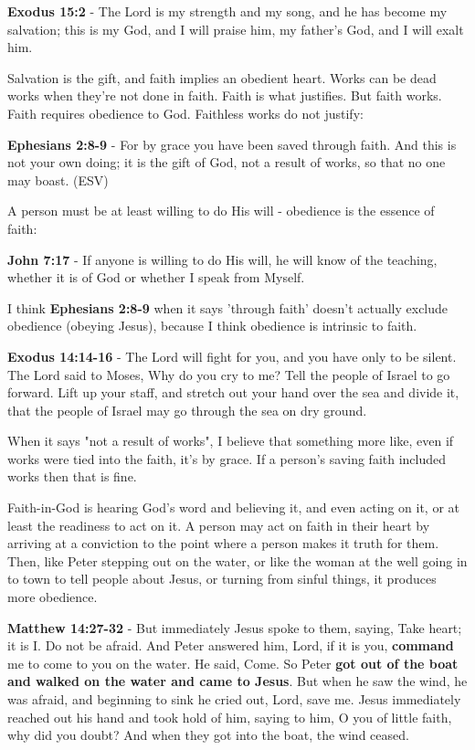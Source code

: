 \documentclass[11pt]{article}
\begin{document}
\textbf{Exodus 15:2} - The Lord is my strength and my song, and he has become my salvation; this is my God, and I will praise him, my father's God, and I will exalt him.

Salvation is the gift, and faith implies an obedient heart. Works can be dead works when they're not done in faith. Faith is what justifies. But faith works. Faith requires obedience to God. Faithless works do not justify:

\textbf{Ephesians 2:8-9} - For by grace you have been saved through faith. And this is not your own doing; it is the gift of God, not a result of works, so that no one may boast. (ESV)

A person must be at least willing to do His will - obedience is the essence of faith:

\textbf{John 7:17} - If anyone is willing to do His will, he will know of the teaching, whether it is of God or whether I speak from Myself.

I think \textbf{Ephesians 2:8-9} when it says 'through faith' doesn't actually exclude obedience (obeying Jesus), because I think obedience is intrinsic to faith.

\textbf{Exodus 14:14-16} - The Lord will fight for you, and you have only to be silent.  The Lord said to Moses, Why do you cry to me? Tell the people of Israel to go forward.  Lift up your staff, and stretch out your hand over the sea and divide it, that the people of Israel may go through the sea on dry ground.

When it says "not a result of works", I believe that something more like, even if works were tied into the faith, it's by grace. If a person's saving faith included works then that is fine.

Faith-in-God is hearing God's word and believing it, and even acting on it, or at least the readiness to act on it.
A person may act on faith in their heart by arriving at a conviction to the point where a person makes it truth for them.
Then, like Peter stepping out on the water, or like the woman at the well going in to town to tell people about Jesus, or turning from sinful things, it produces more obedience.

\textbf{Matthew 14:27-32} - But immediately Jesus spoke to them, saying, Take heart; it is I. Do not be afraid. And Peter answered him, Lord, if it is you, \textbf{command} me to come to you on the water. He said, Come. So Peter \textbf{got out of the boat and walked on the water and came to Jesus}. But when he saw the wind, he was afraid, and beginning to sink he cried out, Lord, save me. Jesus immediately reached out his hand and took hold of him, saying to him, O you of little faith, why did you doubt? And when they got into the boat, the wind ceased.
\end{document}
